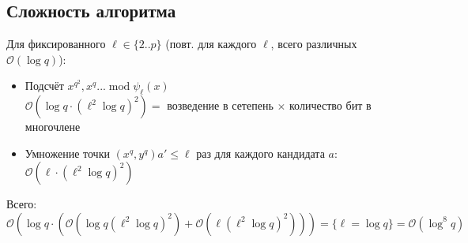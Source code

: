 \documentclass[12pt]{article}
\newcommand{\bigO}{\mathcal{O}}
\theoremstyle{definition}
\theoremstyle{definition}
\theoremstyle{definition}
\begin{document}
\subsection{Сложность алгоритма}

Для фиксированного $\ell\in\{2 .. p\}$ (повт. для каждого $\ell$, всего различных $\bigO(\log q)$):
\begin{itemize}
    \item Подсчёт $x^{q^2}, x^q ... \operatorname{ mod } \psi_\ell(x)$\\
    $\bigO(\log q \cdot (\ell^2 \log q)^2) = $ возведение в сетепень $\times$ количество бит в многочлене
    
    \item Умножение точки $(x^q, y^q) a' \leq \ell$ раз для каждого кандидата $a:$\\
    $\bigO(\ell\cdot(\ell^2 \log q)^2)$
\end{itemize}
Всего: $\bigO(\log q \cdot(\bigO(\log q (\ell^2 \log q)^2) + \bigO(\ell(\ell^2 \log q)^2))) = \{\ell=\log q\} = \bigO(\log^8 q)$
\end{document}

